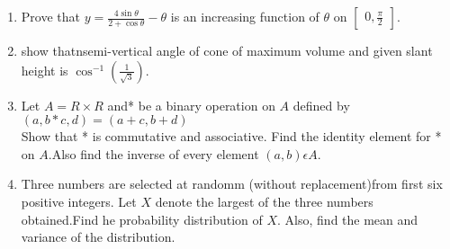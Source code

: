 \documentclass[12pt,-letter paper]{article}
\providecommand{\myvec}[1]{\ensuremath{\begin{bmatrix}#1\end{bmatrix}}}
\providecommand{\brak}[1]{\ensuremath{\left(#1\right)}}
\begin{document}
\begin{enumerate}
  \item Prove that $y=\frac{4\sin{\theta}}{2+\cos{\theta}}-\theta$ is an increasing function of $\theta$ on  $\myvec{0,\frac{\pi}{2}}$.

  \item  show thatnsemi-vertical angle of cone of maximum volume and given slant height is  $\cos^{-1}(\frac{1}{\sqrt{3}})$.
     
  \item Let $A=R\times R$ and* be a binary operation on $A$ defined by\\ $\brak{{a,b}*{c,d}}=\brak{a+c,b+d}$\\
	  Show that * is commutative and associative. Find the identity element for * on $A$.Also find the inverse of every element $\brak{a,b}\epsilon A$.

 
   \item Three numbers are selected at randomm (without replacement)from first six positive integers. Let $X$ denote the largest of the three numbers obtained.Find he probability distribution of $X$. Also, find the mean and variance of the distribution.

\end{enumerate}        
\end{document}
